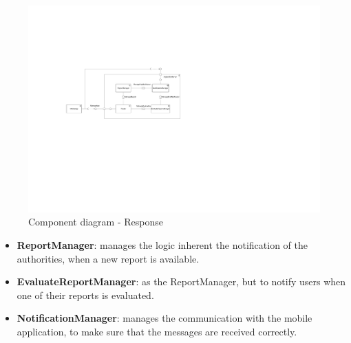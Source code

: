 \documentclass[12pt,a4paper]{report}
\begin{document}
	\begin{figure}[H]
				\includegraphics[scale = 0.5, center]{ComponentDiagramResponse}
				\caption{Component diagram - Response}
	\end{figure}
		\begin{itemize}
			\item\textbf{ReportManager}: manages the logic inherent the notification of the authorities, when a new report is available.
			\item\textbf{EvaluateReportManager}: as the ReportManager, but to notify users when one of their reports is evaluated.
			\item\textbf{NotificationManager}: manages the communication with the mobile application, to make sure that the messages are received correctly.
		\end{itemize}
\end{document}
